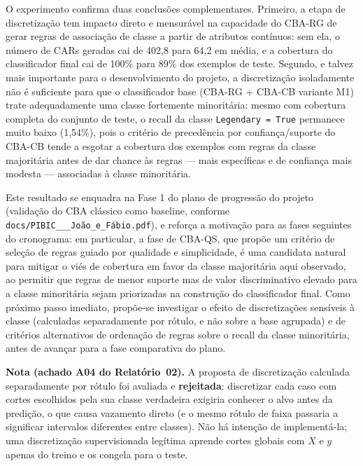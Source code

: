 \documentclass[a4paper,11pt]{article}
\begin{document}
O experimento confirma duas conclusões complementares. Primeiro, a etapa de
discretização tem impacto direto e mensurável na capacidade do CBA-RG de
gerar regras de associação de classe a partir de atributos contínuos: sem
ela, o número de CARs geradas cai de 402,8 para 64,2 em média, e a
cobertura do classificador final cai de 100\% para 89\% dos exemplos de
teste. Segundo, e talvez mais importante para o desenvolvimento do
projeto, a discretização isoladamente não é suficiente para que o
classificador base (CBA-RG + CBA-CB variante M1) trate adequadamente uma
classe fortemente minoritária: mesmo com cobertura completa do conjunto de
teste, o recall da classe \texttt{Legendary\,=\,True} permanece muito
baixo (1,54\%), pois o critério de precedência por confiança/suporte do
CBA-CB tende a esgotar a cobertura dos exemplos com regras da classe
majoritária antes de dar chance às regras — mais específicas e de
confiança mais modesta — associadas à classe minoritária.

Este resultado se enquadra na Fase 1 do plano de progressão do projeto
(validação do CBA clássico como baseline, conforme
\texttt{docs/PIBIC\_\_\_João\_e\_Fábio.pdf}), e reforça a motivação para as
fases seguintes do cronograma: em particular, a fase de CBA-QS, que
propõe um critério de seleção de regras guiado por qualidade e
simplicidade, é uma candidata natural para mitigar o viés de cobertura em
favor da classe majoritária aqui observado, ao permitir que regras de
menor suporte mas de valor discriminativo elevado para a classe minoritária
sejam priorizadas na construção do classificador final. Como próximo passo
imediato, propõe-se investigar o efeito de discretizações sensíveis à
classe (calculadas separadamente por rótulo, e não sobre a base agrupada)
e de critérios alternativos de ordenação de regras sobre o recall da classe
minoritária, antes de avançar para a fase comparativa do plano.

\medskip
\noindent\textbf{Nota (achado A04 do Relatório~02).} A proposta de discretização
calculada separadamente por rótulo foi avaliada e \textbf{rejeitada}: discretizar
cada caso com cortes escolhidos pela sua classe verdadeira exigiria conhecer o
alvo antes da predição, o que causa vazamento direto (e o mesmo rótulo de faixa
passaria a significar intervalos diferentes entre classes). Não há intenção de
implementá-la; uma discretização supervisionada legítima aprende cortes globais
com $X$ e $y$ apenas do treino e os congela para o teste.
\end{document}

